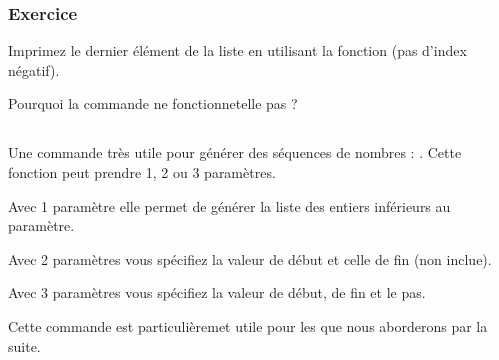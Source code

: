\documentclass[letterpaper,10pt,english]{sphinxmanual}
\begin{document}
\subsubsection{Exercice}
\label{\detokenize{src/OCI02_Listes:id4}}
Imprimez le dernier élément de la liste  en utilisant la fonction  (pas d’index négatif).

Pourquoi la commande  ne fonctionne\sphinxhyphen{}t\sphinxhyphen{}elle pas ?



\subsection{}
\label{\detokenize{src/OCI02_Listes:range}}
Une commande très utile pour générer des séquences de nombres : .
Cette fonction peut prendre 1, 2 ou 3 paramètres.

Avec 1 paramètre elle permet de générer la liste des entiers inférieurs au paramètre.

\begin{sphinxVerbatim}[commandchars=\\\{\}]
\end{sphinxVerbatim}

Avec 2 paramètres vous spécifiez la valeur de début et celle de fin (non inclue).

\begin{sphinxVerbatim}[commandchars=\\\{\}]
\end{sphinxVerbatim}

Avec 3 paramètres vous spécifiez la valeur de début, de fin et le pas.

\begin{sphinxVerbatim}[commandchars=\\\{\}]
\end{sphinxVerbatim}

Cette commande est particulièremet utile pour les  que nous aborderons par la suite.
\end{document}
